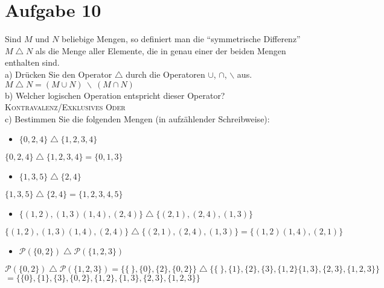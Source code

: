 \section*{Aufgabe 10}

Sind $M$ und $N$ beliebige Mengen, so definiert man die ``symmetrische Differenz'' $M \bigtriangleup N$ als die Menge aller Elemente, die in genau einer der beiden Mengen enthalten sind.\\

a) Drücken Sie den Operator $\bigtriangleup$ durch die Operatoren $\cup$, $\cap$, $\backslash$ aus.\\

$M \bigtriangleup N = (M \cup N) \ \backslash \ (M \cap N)$\\

b) Welcher logischen Operation entspricht dieser Operator?\\

\textsc{Kontravalenz/Exklusives Oder}\\

c) Bestimmen Sie die folgenden Mengen (in aufzählender Schreibweise):

\begin{itemize}
\item $\{0, 2, 4\} \bigtriangleup \{1, 2, 3, 4\}$
\end{itemize}

$\{0, 2, 4\} \bigtriangleup \{1, 2, 3, 4\} = \{ 0, 1, 3 \}$

\begin{itemize}
\item $\{1, 3, 5\} \bigtriangleup \{2, 4\}$
\end{itemize}

$\{1, 3, 5\} \bigtriangleup \{2, 4\} = \{ 1, 2, 3, 4, 5 \}$

\begin{itemize}
\item $\{ (1,2), (1,3) (1,4), (2,4) \} \bigtriangleup \{ (2,1), (2,4), (1,3) \}$
\end{itemize}

$\{ (1,2), (1,3) (1,4), (2,4) \} \bigtriangleup \{ (2,1), (2,4), (1,3) \} = \{ (1,2) (1,4), (2,1) \} $

\begin{itemize}
\item $\mathcal{P}( \{0,2\} ) \bigtriangleup \mathcal{P}( \{1, 2, 3\} )$
\end{itemize}

$\mathcal{P}( \{0,2\} ) \bigtriangleup \mathcal{P}( \{1, 2, 3\} ) = \{ \{ \ \}, \{0\}, \{2\}, \{0, 2\}\} \bigtriangleup \{ \{ \ \}, \{1\}, \{2\}, \{3\}, \{1, 2\} \{1, 3\}, \{2, 3\}, \{1, 2, 3\} \}$\\
\hspace*{10.26em}$= \{ \{0\}, \{1\}, \{3\}, \{0,2\}, \{1,2\}, \{1,3\}, \{2,3\}, \{1,2,3\} \}$

